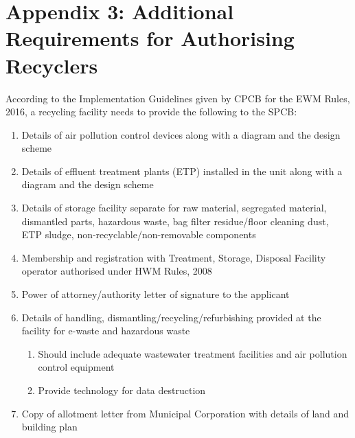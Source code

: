 \documentclass[a4paper, 12pt]{article}
\begin{document}
        \newpage
             \section*{Appendix 3: Additional Requirements for Authorising Recyclers}
        
        \begin{mdframed}[backgroundcolor=gray!20]
        According to the Implementation Guidelines given by CPCB for the EWM Rules, 2016, a recycling facility needs to provide the following to the SPCB:
            \begin{enumerate}
            
                       \item Details of air pollution control devices along with a diagram and the design scheme
                        \item Details of effluent treatment plants (ETP) installed in the unit along with a diagram and the design scheme 
                        \item Details of storage facility separate for raw material, segregated material, dismantled parts, hazardous waste, bag filter residue/floor cleaning dust, ETP sludge, non-recyclable/non-removable components
                             \item Membership and registration with Treatment, Storage, Disposal Facility operator authorised under HWM Rules, 2008
                              \item Power of attorney/authority letter of signature to the applicant
                               \item Details of handling, dismantling/recycling/refurbishing provided at the facility for e-waste and hazardous waste		                  
                               \begin{enumerate}
                          	 	\item Should include adequate wastewater treatment facilities and air pollution control equipment 
                    	 		 \item Provide technology for data destruction 
                      		 \end{enumerate}
                       \item Copy of allotment letter from Municipal Corporation with details of land and building plan \\
            \end{enumerate}
            

\end{mdframed}
\end{document}
